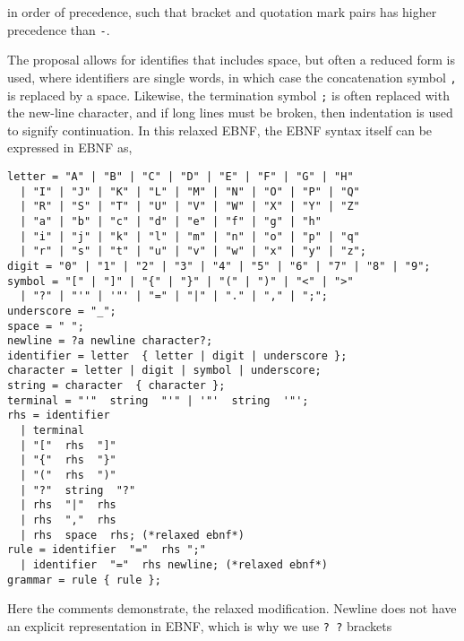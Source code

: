 \documentclass[fsharpnotes.tex]{subfiles}
\begin{document}
in order of precedence, such that bracket and quotation mark pairs has higher precedence than \lstinline[language=ebnf]{-}. 

The proposal allows for identifies that includes space, but often a reduced form is used, where identifiers are single words, in which case the concatenation symbol \lstinline[language=ebnf]|,| is replaced by a space. Likewise, the termination symbol \lstinline[language=ebnf]|;| is often replaced with the new-line character, and if long lines must be broken, then indentation is used to signify continuation. In this relaxed EBNF, the EBNF syntax itself can be expressed in EBNF as,
\begin{lstlisting}[language=ebnf]
letter = "A" | "B" | "C" | "D" | "E" | "F" | "G" | "H" 
  | "I" | "J" | "K" | "L" | "M" | "N" | "O" | "P" | "Q" 
  | "R" | "S" | "T" | "U" | "V" | "W" | "X" | "Y" | "Z"
  | "a" | "b" | "c" | "d" | "e" | "f" | "g" | "h" 
  | "i" | "j" | "k" | "l" | "m" | "n" | "o" | "p" | "q" 
  | "r" | "s" | "t" | "u" | "v" | "w" | "x" | "y" | "z";
digit = "0" | "1" | "2" | "3" | "4" | "5" | "6" | "7" | "8" | "9";
symbol = "[" | "]" | "{" | "}" | "(" | ")" | "<" | ">"
  | "?" | "'" | '"' | "=" | "|" | "." | "," | ";";
underscore = "_";
space = " ";
newline = ?a newline character?;
identifier = letter  { letter | digit | underscore };
character = letter | digit | symbol | underscore; 
string = character  { character };
terminal = "'"  string  "'" | '"'  string  '"';
rhs = identifier
  | terminal
  | "["  rhs  "]"
  | "{"  rhs  "}"
  | "("  rhs  ")"
  | "?"  string  "?"
  | rhs  "|"  rhs
  | rhs  ","  rhs
  | rhs  space  rhs; (*relaxed ebnf*)
rule = identifier  "="  rhs ";"
  | identifier  "="  rhs newline; (*relaxed ebnf*)
grammar = rule { rule };
\end{lstlisting}
Here the comments demonstrate, the relaxed modification. Newline does not have an explicit representation in EBNF, which is why we use \lstinline[language=ebnf]{? ?} brackets
\end{document}
